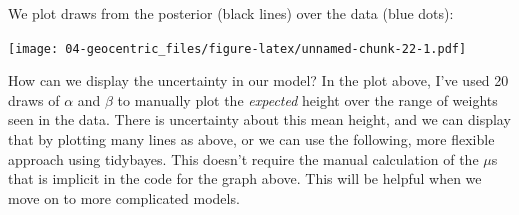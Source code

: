\documentclass[
]{book}
\newenvironment{Shaded}{\begin{snugshade}}{\end{snugshade}}
\newcommand{\AttributeTok}[1]{\textcolor[rgb]{0.77,0.63,0.00}{#1}}
\newcommand{\CommentTok}[1]{\textcolor[rgb]{0.56,0.35,0.01}{\textit{#1}}}
\newcommand{\DecValTok}[1]{\textcolor[rgb]{0.00,0.00,0.81}{#1}}
\newcommand{\FloatTok}[1]{\textcolor[rgb]{0.00,0.00,0.81}{#1}}
\newcommand{\FunctionTok}[1]{\textcolor[rgb]{0.00,0.00,0.00}{#1}}
\newcommand{\NormalTok}[1]{#1}
\newcommand{\OtherTok}[1]{\textcolor[rgb]{0.56,0.35,0.01}{#1}}
\newcommand{\SpecialCharTok}[1]{\textcolor[rgb]{0.00,0.00,0.00}{#1}}
\newcommand{\StringTok}[1]{\textcolor[rgb]{0.31,0.60,0.02}{#1}}
\begin{document}
We plot draws from the posterior (black lines) over the data (blue dots):

\begin{Shaded}
\end{Shaded}

\texttt{[image: 04-geocentric\_files/figure-latex/unnamed-chunk-22-1.pdf]}

How can we display the uncertainty in our model? In the plot above, I've used 20 draws of \(\alpha\) and \(\beta\) to manually plot the \emph{expected} height over the range of weights seen in the data. There is uncertainty about this mean height, and we can display that by plotting many lines as above, or we can use the following, more flexible approach using tidybayes. This doesn't require the manual calculation of the \(\mu\)s that is implicit in the code for the graph above. This will be helpful when we move on to more complicated models.
\end{document}
